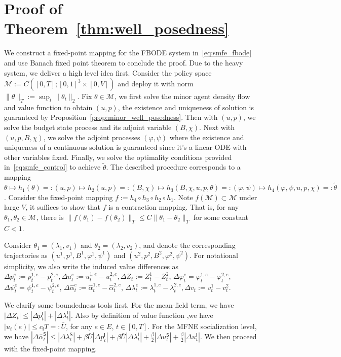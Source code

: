 \documentclass[letterpaper, 10 pt, conference]{ieeeconf}  %
\def\sS{\mathsf{S}}
\def\sI{\mathsf{I}}
\begin{document}
\section{Proof of Theorem~\ref{thm:well_posedness}}
We construct a fixed-point mapping for the FBODE system in~\eqref{eq:smfe_fbode} and use Banach fixed point theorem to conclude the proof. Due to the heavy system, we deliver a high level idea first. Consider the policy space $\mathcal{M} := C([0,T];[0,1]^3 \times [0,V])$ and deploy it with norm $\|\theta\|_T := \sup_t \|\theta_t\|_2$. Fix $\theta \in \mathcal{M}$, we first solve the minor agent density flow and value function to obtain $(u,p)$, the existence and uniqueness of solution is guaranteed by Proposition~\ref{prop:minor_well_posedness}. Then with $(u,p)$, we solve the budget state process and its adjoint variable $(B, \chi)$. Next with $(u,p,B,\chi)$, we solve the adjoint processes $(\varphi,\psi)$ where the existence and uniqueness of a continuous solution is guaranteed since it's a linear ODE with other variables fixed. Finally, we solve the optimality conditions provided in~\eqref{eq:smfe_control} to achieve $\tilde{\theta}$. The described procedure corresponds to a mapping $\theta \mapsto h_1(\theta) =: (u,p) \mapsto h_2(u,p) =: (B,\chi) \mapsto h_3(B, \chi, u, p, \theta) =: (\varphi,\psi) \mapsto h_4(\varphi,\psi, u, p, \chi) =: \tilde{\theta}$. Consider the fixed-point mapping $f := h_4 \circ h_3 \circ h_2 \circ h_1$. Note $f(\mathcal{M}) \subset \mathcal{M}$ under large $V$, 
it suffices to show that $f$ is a contraction mapping. That is, for any $\theta_1, \theta_2 \in \mathcal{M}$, there is $\|f(\theta_1) - f(\theta_2)\|_T \leq C \|\theta_1 - \theta_2\|_T$ for some constant $C < 1$.

Consider $\theta_1 = (\lambda_1,v_1)$ and $\theta_2 = (\lambda_2,v_2)$, and denote the corresponding trajectories as $(u^1,p^1,B^1,\varphi^1,\psi^1)$ and $(u^2,p^2,B^2,\varphi^2,\psi^2)$. For notational simplicity, we also write the induced value differences as $
\Delta p_t^e:=p_t^{1,e}-p_t^{2,e},
\Delta u_t^e:=u_t^{1,e}-u_t^{2,e},
\Delta Z_t:=Z_t^1-Z_t^2$, $\Delta \varphi_t^e =\varphi_t^{1,e} - \varphi_t^{2,e}$, $\Delta \psi_t^e =\psi_t^{1,e} - \psi_t^{2,e}$, $\Delta \hat\alpha^e_t:=\hat\alpha_t^{1,e}-\hat\alpha_t^{2,e}$, 
$\Delta \lambda_t^e:=\lambda_{t}^{1,e}-\lambda_{t}^{2,e},
\Delta v_{t}:=v_{t}^1-v_{t}^2$.


We clarify some boundedness tools first. For the mean-field term, we have $|\Delta Z_t|\leq |\Delta p_t^\sI|+ |\Delta \lambda_t^{\sI}|$. Also by definition of value function ,we have $\left|u_t(e)\right| \leq c_\sI T =: \bar{U}$, for any $e \in E$, $t \in [0,T]$. For the MFNE socialization level, we have $|\Delta\hat\alpha_t^\sS|\le|\Delta \lambda_t^{\sS}|+\beta\bar U |\Delta p_t^\sI|+\beta\bar U |\Delta \lambda_t^{\sI}|+\frac{\beta}{2}|\Delta u_t^\sS|+\frac{\beta}{2}|\Delta u_t^\sI|$. We then proceed with the fixed-point mapping.
\end{document}
